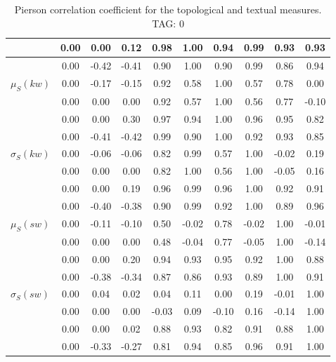 \begin{table*}[h!]
\begin{center}
\begin{tabular}{| l | c | c | c | c | c | c | c | c | c |}
 & 0.00  & 0.00  & 0.12  & 0.98  & 1.00  & 0.94  & 0.99  & 0.93  & 0.93 \\\hline
 & 0.00  & -0.42  & -0.41  & 0.90  & 1.00  & 0.90  & 0.99  & 0.86  & 0.94 \\\hline
$\mu_S(kw)$ & 0.00  & -0.17  & -0.15  & 0.92  & 0.58  & 1.00  & 0.57  & 0.78  & 0.00 \\\hline
 & 0.00  & 0.00  & 0.00  & 0.92  & 0.57  & 1.00  & 0.56  & 0.77  & -0.10 \\\hline
 & 0.00  & 0.00  & 0.30  & 0.97  & 0.94  & 1.00  & 0.96  & 0.95  & 0.82 \\\hline
 & 0.00  & -0.41  & -0.42  & 0.99  & 0.90  & 1.00  & 0.92  & 0.93  & 0.85 \\\hline
$\sigma_S(kw)$ & 0.00  & -0.06  & -0.06  & 0.82  & 0.99  & 0.57  & 1.00  & -0.02  & 0.19 \\\hline
 & 0.00  & 0.00  & 0.00  & 0.82  & 1.00  & 0.56  & 1.00  & -0.05  & 0.16 \\\hline
 & 0.00  & 0.00  & 0.19  & 0.96  & 0.99  & 0.96  & 1.00  & 0.92  & 0.91 \\\hline
 & 0.00  & -0.40  & -0.38  & 0.90  & 0.99  & 0.92  & 1.00  & 0.89  & 0.96 \\\hline
$\mu_S(sw)$ & 0.00  & -0.11  & -0.10  & 0.50  & -0.02  & 0.78  & -0.02  & 1.00  & -0.01 \\\hline
 & 0.00  & 0.00  & 0.00  & 0.48  & -0.04  & 0.77  & -0.05  & 1.00  & -0.14 \\\hline
 & 0.00  & 0.00  & 0.20  & 0.94  & 0.93  & 0.95  & 0.92  & 1.00  & 0.88 \\\hline
 & 0.00  & -0.38  & -0.34  & 0.87  & 0.86  & 0.93  & 0.89  & 1.00  & 0.91 \\\hline
$\sigma_S(sw)$ & 0.00  & 0.04  & 0.02  & 0.04  & 0.11  & 0.00  & 0.19  & -0.01  & 1.00 \\\hline
 & 0.00  & 0.00  & 0.00  & -0.03  & 0.09  & -0.10  & 0.16  & -0.14  & 1.00 \\\hline
 & 0.00  & 0.00  & 0.02  & 0.88  & 0.93  & 0.82  & 0.91  & 0.88  & 1.00 \\\hline
 & 0.00  & -0.33  & -0.27  & 0.81  & 0.94  & 0.85  & 0.96  & 0.91  & 1.00 \\\hline
\end{tabular}
\caption{Pierson correlation coefficient for the topological and textual measures. TAG: 0}
\end{center}
\end{table*}